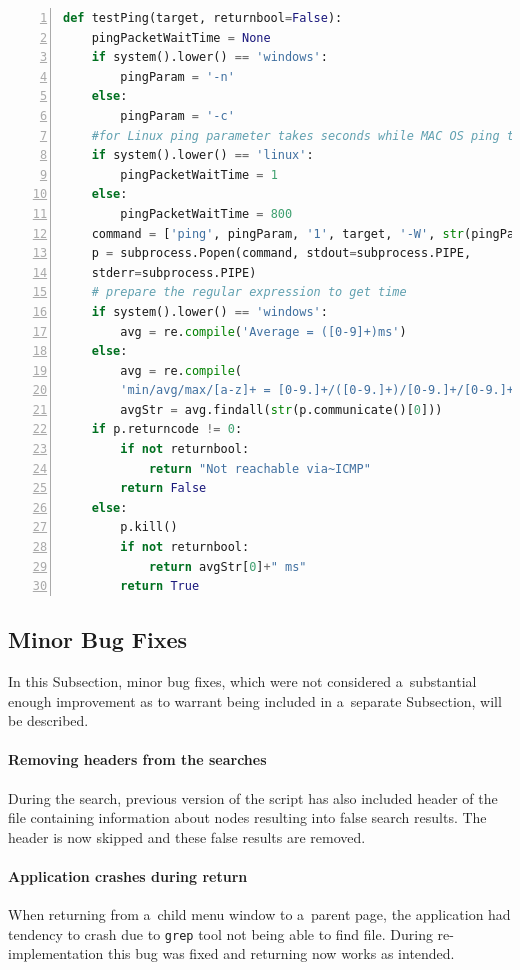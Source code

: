 {{{{{{{\noindent\begin{minipage}{\linewidth}
		\begin{lstlisting}[language=Python, numbers=left, label={lst:testping}, caption={Example of fully multi-platform function testPing.}, frame=single, showstringspaces=false, breaklines=true, keywordstyle=\color{blue},captionpos=b]
def testPing(target, returnbool=False):
	pingPacketWaitTime = None
	if system().lower() == 'windows':
		pingParam = '-n'
	else:
		pingParam = '-c'
	#for Linux ping parameter takes seconds while MAC OS ping takes miliseconds
	if system().lower() == 'linux':
		pingPacketWaitTime = 1
	else:
		pingPacketWaitTime = 800
	command = ['ping', pingParam, '1', target, '-W', str(pingPacketWaitTime)]
	p = subprocess.Popen(command, stdout=subprocess.PIPE,
	stderr=subprocess.PIPE)
	# prepare the regular expression to get time
	if system().lower() == 'windows':
		avg = re.compile('Average = ([0-9]+)ms')
	else:
		avg = re.compile(
		'min/avg/max/[a-z]+ = [0-9.]+/([0-9.]+)/[0-9.]+/[0-9.]+')
		avgStr = avg.findall(str(p.communicate()[0]))
	if p.returncode != 0:
		if not returnbool:
			return "Not reachable via~ICMP"
		return False
	else:
		p.kill()
		if not returnbool:
			return avgStr[0]+" ms"
		return True
		\end{lstlisting}
	\end{minipage}

\subsection{Minor Bug Fixes}
In this Subsection, minor bug fixes, which were not considered a~substantial enough improvement as to warrant being included in a~separate Subsection, will be described.
\paragraph{Removing headers from the searches}
During the search, previous version of the script has also included header of the file containing information about nodes resulting into false search results. The header is now skipped and these false results are removed.
\paragraph{Application crashes during return}
When returning from a~child menu window to a~parent page, the application had tendency to crash due to \texttt{grep} tool not being able to find file. During re-implementation this bug was fixed and returning now works as intended.

}}}}}}}
